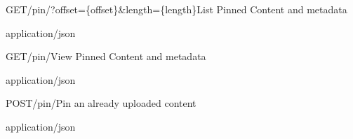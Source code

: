 
\begin{apiRoute}{GET}{/pin/?offset=\{offset\}\&length=\{length\}}{List Pinned Content and metadata}
{
}
{ }

\begin{queryParameter} 
\end{queryParameter}
\begin{routeResponse}{application/json}
\end{routeResponse}
\end{apiRoute}


\begin{apiRoute}{GET}{/pin/}{View Pinned Content and metadata}
{
}
{ }

\begin{queryParameter} 
\end{queryParameter}
\begin{routeResponse}{application/json}
\end{routeResponse}
\end{apiRoute}




\begin{apiRoute}{POST}{/pin/}{Pin an already uploaded content}
{
}
{ }

\begin{routeParameter} 
\end{routeParameter}
\begin{routeResponse}{application/json}
\end{routeResponse}
\end{apiRoute}





  




